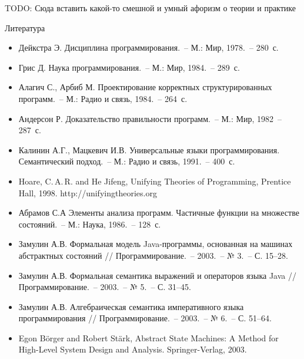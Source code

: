 \documentclass[landscape]{slides}
\begin{document}
\begin{slide}
    \begin{center}
        \begin{LARGE}
            TODO: Сюда вставить какой-то смешной и умный афоризм о теории и практике
        \end{LARGE}
    \end{center}
\end{slide}

\begin{slide}
Литература
\begin{itemize}
\item Дейкстра Э. Дисциплина программирования.~-- М.: Мир, 1978.~-- 280~с.
\item Грис Д. Наука программирования.~-- М.: Мир, 1984.~-- 289~с.
\item Алагич С., Арбиб М. Проектирование корректных структурированных программ.~-- М.: Радио и связь, 1984.~-- 264~с.
\item Андерсон Р. Доказательство правильности программ.~-- М.: Мир, 1982~-- 287~с.
\item Калинин А.Г., Мацкевич И.В. Универсальные языки программирования. Семантический подход.~-- М.: Радио и связь, 1991.~-- 400~с.
\item Hoare, C.\,A.\,R. and He Jifeng, Unifying Theories of Programming, Prentice Hall, 1998. http://unifyingtheories.org
\end{itemize}
\end{slide}

\begin{slide}
\begin{itemize}
\item Абрамов С.А  Элементы анализа программ. Частичные функции на множестве состояний.~-- М.: Наука, 1986.~-- 128~с.
\item Замулин А.В. Формальная модель Java-программы, основанная на машинах абстрактных состояний // Программирование.~-- 2003.~-- № 3.~-- С. 15–28.
\item Замулин А.В. Формальная семантика выражений и операторов языка Java // Программирование.~-- 2003.~-- № 5.~-- С. 31–45.
\item Замулин А.В. Алгебраическая семантика императивного языка программирования // Программирование.~-- 2003.~-- № 6.~-- С. 51–64.
\item Egon Börger and Robert Stärk, Abstract State Machines: A Method for High-Level System Design and Analysis. Springer-Verlag, 2003.
\end{itemize}
\end{slide}
\end{document}
